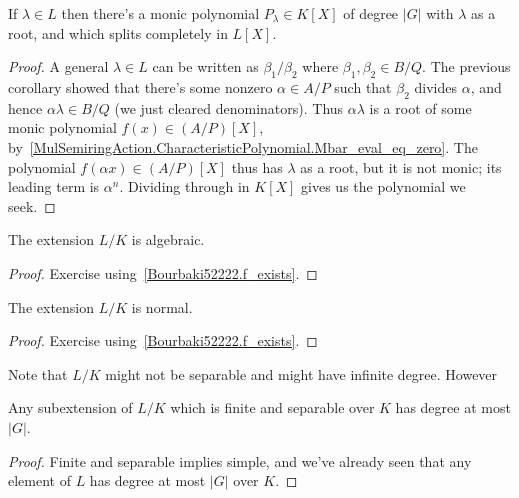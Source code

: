 \begin{theorem}
  \label{Bourbaki52222.f_exists}
  If $\lambda\in L$ then there's a monic polynomial $P_\lambda\in K[X]$ of degree $|G|$
  with $\lambda$ as a root, and which splits completely in $L[X]$.
  \leanok
\end{theorem}
\begin{proof}
  A general $\lambda\in L$ can be written as $\beta_1/\beta_2$ where $\beta_1,\beta_2\in B/Q$.
  The previous corollary showed that there's some nonzero $\alpha\in A/P$ such that $\beta_2$
  divides $\alpha$, and hence $\alpha\lambda\in B/Q$ (we just cleared denominators).
  Thus $\alpha\lambda$ is a root of some monic polynomial $f(x)\in (A/P)[X]$,
  by~\ref{MulSemiringAction.CharacteristicPolynomial.Mbar_eval_eq_zero}.
  The polynomial $f(\alpha x)\in (A/P)[X]$ thus
  has $\lambda$ as a root, but it is not monic; its leading term is $\alpha^n$.
  Dividing through in $K[X]$ gives us the polynomial we seek.
\end{proof}

\begin{corollary}
  \label{Bourbaki52222.algebraic}
  \leanok
  The extension $L/K$ is algebraic.
\end{corollary}
\begin{proof}
  Exercise using~\ref{Bourbaki52222.f_exists}.
\end{proof}

\begin{corollary}
  \label{Bourbaki52222.normal}
  \leanok
  The extension $L/K$ is normal.
\end{corollary}
\begin{proof}
  Exercise using~\ref{Bourbaki52222.f_exists}.
\end{proof}

Note that $L/K$ might not be separable and might have infinite degree. However

\begin{corollary}
  \label{Bourbaki52222.finite_separable_subextension_finrank_le}
  Any subextension of $L/K$ which is finite and separable over $K$
  has degree at most $|G|$.
\end{corollary}
\begin{proof}
  Finite and separable implies simple, and we've already seen that any
  element of $L$ has degree at most $|G|$ over $K$.
\end{proof}

